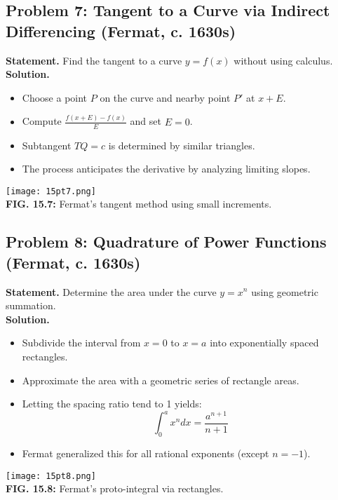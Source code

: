 \documentclass[9pt]{article}
\begin{document}
\subsection*{Problem 7: Tangent to a Curve via Indirect Differencing (Fermat, c. 1630s)}
\textbf{Statement.} Find the tangent to a curve \( y = f(x) \) without using calculus. \\
\textbf{Solution.}
\begin{itemize}
  \item Choose a point \( P \) on the curve and nearby point \( P' \) at \( x + E \).
  \item Compute \( \frac{f(x+E) - f(x)}{E} \) and set \( E = 0 \).
  \item Subtangent \( TQ = c \) is determined by similar triangles.
  \item The process anticipates the derivative by analyzing limiting slopes.
\end{itemize}
\begin{center}
\texttt{[image: 15pt7.png]} \\
\textbf{FIG. 15.7:} Fermat’s tangent method using small increments.
\end{center}

\newpage

\subsection*{Problem 8: Quadrature of Power Functions (Fermat, c. 1630s)}
\textbf{Statement.} Determine the area under the curve \( y = x^n \) using geometric summation. \\
\textbf{Solution.}
\begin{itemize}
  \item Subdivide the interval from \( x = 0 \) to \( x = a \) into exponentially spaced rectangles.
  \item Approximate the area with a geometric series of rectangle areas.
  \item Letting the spacing ratio tend to 1 yields:
  \[
    \int_0^a x^n dx = \frac{a^{n+1}}{n+1}
  \]
  \item Fermat generalized this for all rational exponents (except \( n = -1 \)).
\end{itemize}
\begin{center}
\texttt{[image: 15pt8.png]} \\
\textbf{FIG. 15.8:} Fermat’s proto-integral via rectangles.
\end{center}
\end{document}

